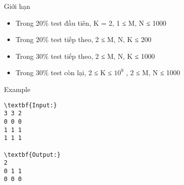 Giới hạn
\begin{itemize}
	\item Trong 20\% test đầu tiên, K = 2, 1 ≤ M, N ≤ 1000
	\item Trong 20\% test tiếp theo, 2 ≤ M, N, K ≤ 200
	\item Trong 30\% test tiếp theo, 2 ≤ M, N, K ≤ 1000
	\item Trong 30\% test còn lại, 2 ≤ K ≤ $10^{9}$ , 2 ≤ M, N ≤ 1000
\end{itemize}
Example
\begin{verbatim}
\textbf{Input:}
3 3 2
0 0 0
1 1 1
1 1 1

\textbf{Output:}
2
0 1 1
0 0 0\end{verbatim}